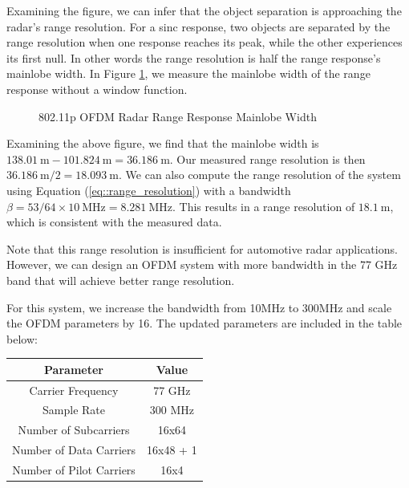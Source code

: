\documentclass[conference]{IEEEtran}
\begin{document}
Examining the figure, we can infer that the object separation is approaching the radar's range resolution. For a sinc response, two objects are separated by the range resolution when one response reaches its peak, while the other experiences its first null. In other words the range resolution is half the range response's mainlobe width. In Figure \ref{fig::ofdm_radar_mainlobe_width}, we measure the mainlobe width of the range response without a window function.

\begin{figure}[H]
\centering
{}
\caption{802.11p OFDM Radar Range Response Mainlobe Width}
\label{fig::ofdm_radar_mainlobe_width}
\end{figure}

Examining the above figure, we find that the mainlobe width is $138.01\ \text{m} - 101.824\ \text{m} = 36.186\ \text{m}$. Our measured range resolution is then $36.186\ \text{m} /2 = 18.093 \ \text{m}$. We can also compute the range resolution of the system using Equation (\ref{eq::range_resolution}) with a bandwidth $\beta = 53/64 \times 10\ \text{MHz} = 8.281\ \text{MHz}$. This results in a range resolution of $18.1\ \text{m}$, which is consistent with the measured data.

Note that this range resolution is insufficient for automotive radar applications. However, we can design an OFDM system with more bandwidth in the 77 GHz band that will achieve better range resolution. 

For this system, we increase the bandwidth from 10MHz to 300MHz and scale the OFDM parameters by 16. The updated parameters are included in the table below:

\begin{center}
\begin{tabular}{|c|c|}
\hline
\textbf {Parameter} & \textbf {Value }\\
\hline
Carrier Frequency & 77 GHz \\
\hline
Sample Rate & 300 MHz \\
\hline
Number of Subcarriers & 16x64\\
\hline
Number of Data Carriers & 16x48 + 1 \\
\hline 
Number of Pilot Carriers & 16x4 \\
\hline 
\end{tabular}
\end{center}
\end{document}
